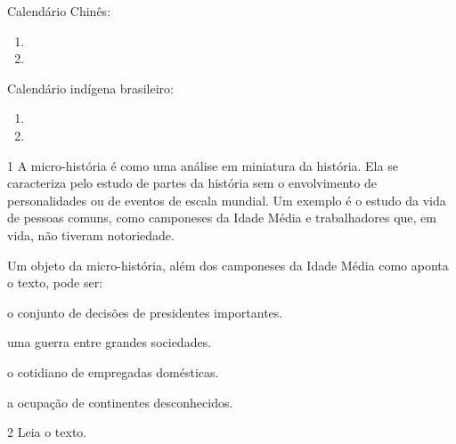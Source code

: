 Calendário Chinês:

\begin{enumerate}
\item {}

\item {}
\end{enumerate}

Calendário indígena brasileiro:

\begin{enumerate}
\item {}

\item {}
\end{enumerate}

\pagebreak
{}

\num{1} A micro-história é como uma análise em miniatura da história. Ela se caracteriza pelo estudo de partes da história sem o envolvimento de personalidades ou de eventos de escala mundial. Um
exemplo é o estudo da vida de pessoas comuns, como camponeses da Idade Média e trabalhadores que, em vida, não tiveram notoriedade.

Um objeto da micro-história, além dos camponeses da Idade Média como
aponta o texto, pode ser:

\begin{escolha}
\item o conjunto de decisões de presidentes importantes.

\item uma guerra entre grandes sociedades.

\item o cotidiano de empregadas domésticas.

\item a ocupação de continentes desconhecidos.
\end{escolha}


\num{2} Leia o texto.


